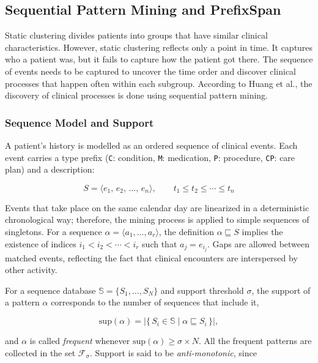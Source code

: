 \subsection{Sequential Pattern Mining and PrefixSpan}

Static clustering divides patients into groups that have similar clinical characteristics. However, static clustering reflects only a point in time. It captures who a patient was, but it fails to capture how the patient got there. The sequence of events needs to be captured to uncover the time order and discover clinical processes that happen often within each subgroup. According to Huang et al.\cite{huang2014}, the discovery of clinical processes is done using sequential pattern mining.

\subsubsection*{Sequence Model and Support}

A patient's history is modelled as an ordered sequence of clinical events. Each event carries a type prefix (\texttt{C}: condition, \texttt{M}: medication, \texttt{P}: procedure, \texttt{CP}: care plan) and a description:

\begin{equation}
    S = \langle e_1,\, e_2,\, \ldots,\, e_n \rangle, \qquad t_1 \leq t_2 \leq \cdots \leq t_n
    \label{eq:sequence}
\end{equation}

Events that take place on the same calendar day are linearized in a deterministic chronological way; therefore, the mining process is applied to simple sequences of singletons. For a sequence $\alpha = \langle a_1, \ldots, a_r \rangle$, the definition $\alpha \sqsubseteq S$ implies the existence of indices $i_1 < i_2 < \cdots < i_r$ such that $a_j = e_{i_j}$. Gaps are allowed between matched events, reflecting the fact that clinical encounters are interspersed by other activity.

For a sequence database $\mathbb{S} = \{S_1, \ldots, S_N\}$ and support threshold $\sigma$, the support of a pattern $\alpha$ corresponds to the number of sequences that include it,

\begin{equation}
    \mathrm{sup}(\alpha) = \bigl|\{\, S_i \in \mathbb{S} \mid \alpha \sqsubseteq S_i \,\}\bigr|,
    \label{eq:support}
\end{equation}

and $\alpha$ is called \emph{frequent} whenever $\mathrm{sup}(\alpha) \geq \sigma \times N$. All the frequent patterns are collected in the set $\mathcal{F}_\sigma$. Support is said to be \emph{anti-monotonic}, since

